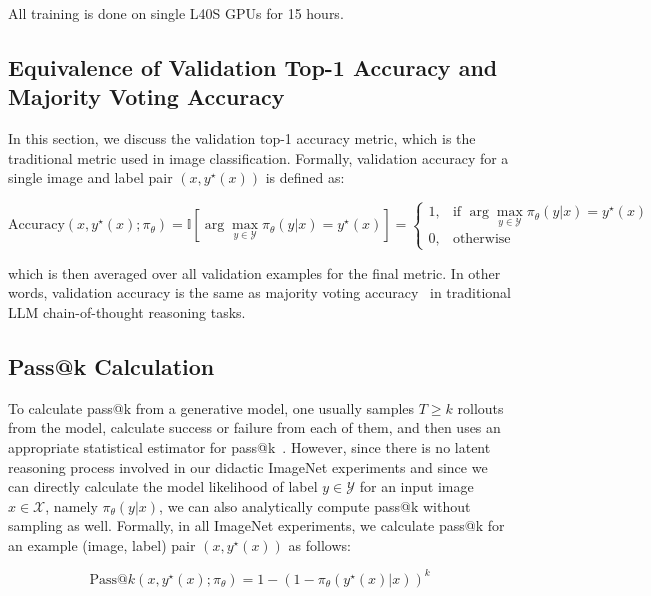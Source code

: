 \documentclass[10pt]{article} %
\begin{document}
All training is done on single L40S GPUs for 15 hours. 


\subsection{Equivalence of Validation Top-1 Accuracy and Majority Voting Accuracy} \label{app:imagenet_majority_voting_accuracy}

In this section, we discuss the validation top-1 accuracy metric, which is the traditional metric used in image classification. Formally, validation accuracy for a single image and label pair $(x, y^\star(x))$ is defined as:

\begin{equation*}
    \text{Accuracy}(x, y^\star(x) ; \pi_\theta) = \mathbb{I}\left[\arg\max_{y \in \mathcal{Y}} \pi_\theta(y|x) = y^\star(x) \right] = \begin{cases}
        1, & \text{if } \arg\max_{y \in \mathcal{Y}} \pi_\theta(y|x) = y^\star(x) \\
        0, & \text{otherwise}
    \end{cases}
\end{equation*}

which is then averaged over all validation examples for the final metric. In other words, validation accuracy is the same as majority voting accuracy~\citep{wang2023selfconsistencyimproveschainthought} in traditional LLM chain-of-thought reasoning tasks.

\subsection{Pass@k Calculation}

To calculate pass@k from a generative model, one usually samples $T \geq k$ rollouts from the model, calculate success or failure from each of them, and then uses an appropriate statistical estimator for pass@k~\citep{chen2021evaluatinglargelanguagemodels,yue2025doesreinforcementlearningreally}. However, since there is no latent reasoning process involved in our didactic ImageNet experiments and since we can directly calculate the model likelihood of label $y \in \mathcal{Y}$ for an input image $x \in \mathcal{X}$, namely $\pi_\theta(y | x)$, we can also analytically compute pass@k without sampling as well. Formally, in all ImageNet experiments, we calculate pass@k for an example (image, label) pair $(x, y^\star(x))$ as follows:

\begin{equation*}
    \text{Pass}@k(x, y^\star(x); \pi_\theta) = 1 - (1 - \pi_\theta(y^\star(x)|x))^k
\end{equation*}
\end{document}
